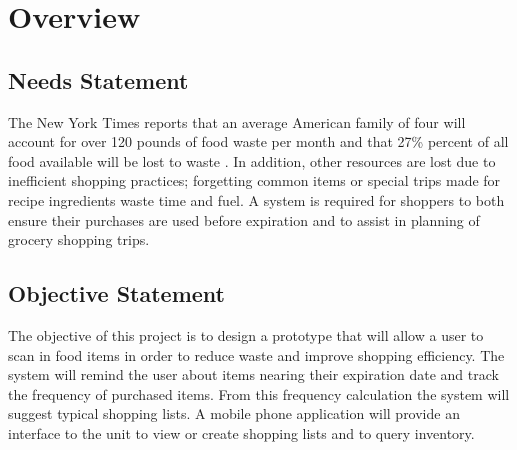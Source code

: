 \documentclass[11pt,letterpaper]{article}
\begin{document}

\tableofcontents
\pagebreak
\section{Overview}
\subsection{Needs Statement}
The New York Times reports that an average American family of four will account for over 120 pounds of food waste per month and that 27\% percent of all food available will be lost to waste \cite{times}. In addition, other resources are lost due to inefficient shopping practices; forgetting common items or special trips made for recipe ingredients waste time and fuel. A system is required for shoppers to both ensure their purchases are used before expiration and to assist in planning of grocery shopping trips.
\subsection{Objective Statement}
The objective of this project is to design a prototype that will allow a user to scan in food items in order to reduce waste and improve shopping efficiency. The system will remind the user about items nearing their expiration date and track the frequency of purchased items. From this frequency calculation the system will suggest typical shopping lists. A mobile phone application will provide an interface to the unit to view or create shopping lists and to query inventory.
\end{document}
